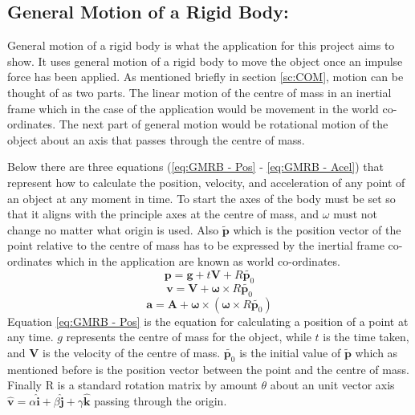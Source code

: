 \subsection{General Motion of a Rigid Body:}\label{sc:GMORB}
General motion of a rigid body is what the application for this project aims to show.
It uses general motion of a rigid body to move the object once an impulse force has been applied.
As mentioned briefly in section \ref{sc:COM}, motion can be thought of as two parts.
The linear motion of the centre of mass in an inertial frame which in the case of the application would be movement in the world co-ordinates.
The next part of general motion would be rotational motion of the object about an axis that passes through the centre of mass. 

Below there are three equations (\ref{eq:GMRB - Pos} - \ref{eq:GMRB - Acel}) that represent how to calculate the position, velocity, and acceleration of any point of an object at any moment in time.
To start the axes of the body must be set so that it aligns with the principle axes at the centre of mass, and $\omega$ must not change no matter what origin is used.
Also $\tilde{\mathbf{p}}$ which is the position vector of the point relative  to the centre of mass has to be expressed by the inertial frame co-ordinates which in the application are known as world co-ordinates.
\begin{equation}\label{eq:GMRB - Pos}
\mathbf{p}=\mathbf{g}+t\mathbf{V}+{R}\tilde{\mathbf{p}_{0}}
\end{equation}
\begin{equation}\label{eq:GMRB - Velo}
\mathbf{v}=\mathbf{V}+\boldsymbol\omega\times{R}\tilde{\mathbf{p}_{0}}
\end{equation}
\begin{equation}\label{eq:GMRB - Acel}
\mathbf{a}=\mathbf{A}+\boldsymbol\omega\times(\boldsymbol\omega\times{R}\tilde{\mathbf{p}_{0}})
\end{equation}
Equation \ref{eq:GMRB - Pos} is the equation for calculating a position of a point at any time. $g$ represents the centre of mass for the object, while $t$ is the time taken, and $\mathbf{V}$ is the velocity of the centre of mass. $\tilde{\mathbf{p}_{0}}$ is the initial value of $\tilde{\mathbf{p}}$ which as mentioned before is the position vector between the point and the centre of mass.
Finally R is a standard rotation matrix by amount $\theta$ about an unit vector axis $\hat{\mathbf{v}} = \alpha\hat{\mathbf{i}} + \beta\hat{\mathbf{j}} + \gamma\hat{\mathbf{k}}$ passing through the origin.
